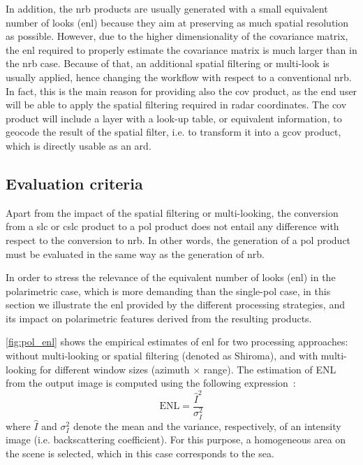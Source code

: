 In addition, the \acs{nrb} products are usually generated with a small equivalent number of looks (\acs{enl}) because they aim at preserving as much spatial resolution as possible. However, due to the higher dimensionality of the covariance matrix, the \acs{enl} required to properly estimate the covariance matrix is much larger than in the \acs{nrb} case. Because of that, an additional spatial filtering or multi-look is usually applied, hence changing the workflow with respect to a conventional \acs{nrb}. In fact, this is the main reason for providing also the \acs{cov} product, as the end user will be able to apply the spatial filtering required in radar coordinates. The \acs{cov} product will include a layer with a look-up table, or equivalent information, to geocode the result of the spatial filter, i.e. to transform it into a \acs{gcov} product, which is directly usable as an \acs{ard}.

\subsection{Evaluation criteria}
\label{sec:pol_criteria}

Apart from the impact of the spatial filtering or multi-looking, the conversion from a \acs{slc} or \acs{cslc} product to a \acs{pol} product does not entail any difference with respect to the conversion to \acs{nrb}. In other words, the generation of a \acs{pol} product must be evaluated in the same way as the generation of \acs{nrb}.

In order to stress the relevance of the equivalent number of looks (\acs{enl}) in the polarimetric case, which is more demanding than the single-pol case, in this section we illustrate the \acs{enl} provided by the different processing strategies, and its impact on polarimetric features derived from the resulting products.

\autoref{fig:pol_enl} shows the empirical estimates of \acs{enl} for two processing approaches: without multi-looking or spatial filtering (denoted as Shiroma), and with multi-looking for different window sizes (azimuth $\times$ range). The estimation of ENL from the output image is computed using the following expression~\cite{lee_intensity_1994}:
\begin{equation}
\text{ENL} = \frac{\hat{I}^2}{\sigma_I^2}
\end{equation}
where $\hat{I}$ and $\sigma_I^2$ denote the mean and the variance, respectively, of an intensity image (i.e. backscattering coefficient).
For this purpose, a homogeneous area on the scene is selected, which in this case corresponds to the sea.

